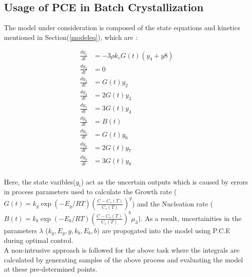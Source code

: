\subsection{Usage of PCE in Batch Crystallization}

The model under consideration is composed of the state equations and kinetics mentioned in Section(\ref{modeleq}), which are :

\begin{align} 
\frac{dy_{1}}{dt} &= -3\rho k_{v}G(t)(y_{4}+y{8}) \\
\frac{dy_{2}}{dt} &= 0 \\
\frac{dy_{3}}{dt} &= G(t)y_{2}  \\
\frac{dy_{4}}{dt} &= 2G(t)y_{3} \\
\frac{dy_{5}}{dt} &= 3G(t)y_{4} \\
\frac{dy_{6}}{dt} &= B(t)  \\
\frac{dy_{7}}{dt} &= G(t)y_{6}  \\
\frac{dy_{8}}{dt} &= 2G(t)y_{7}  \\
\frac{dy_{9}}{dt} &= 3G(t)y_{8}  \\
\end{align}  

Here, the state varibles($y_{i}$) act as the uncertain outputs which is caused by errors in process parameters used to calculate the Growth rate ($G(t) = k_{g}\exp{\left(-E_{g}/RT \right)}\left(\frac{C - C_{s}(T)}{C_{s}(T)}\right)^{g}$) and the Nucleation rate ($B(t) = k_{b}\exp{\left(-E_{b}/RT \right)}\left(\frac{C - C_{s}(T)}{C_{s}(T)}\right)^{b}\mu_{3}$). As a result, uncertainities in the parameters $\lambda$ ($k_{g}, E_{g}, g, k_{b}, E_{b}, b$) are propogated into the model using P.C.E during optimal control.\\
A non-intrusive approach is followed for the above task where the integrals are calculated by generating samples of the above process and evaluating the model at these pre-determined points.
